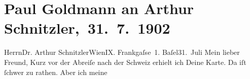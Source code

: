 

         
         \renewcommand{\erwaehntePersonen}{Personen: Maurice Maeterlinck}
         \renewcommand{\erwaehnteInstitutionen}{Institutionen: Deutsches Theater Berlin, Schiller-Theater}
         \renewcommand{\erwaehnteOrte}{Orte: Basel, Berlin, Frankgasse, Schweiz, Wien}
         \renewcommand{\erwaehnteWerke}{Werke: Der Schleier der Beatrice. Schauspiel in fünf Akten, Monna Vanna. Schauspiel in drei Akten}
               \section[ Paul Goldmann an Arthur Schnitzler, 31. 7. 1902]{ Paul Goldmann an Arthur Schnitzler, 31. 7. 1902}\nopagebreak{}\rehead{ }\begin{ledgroupsized}[t]{13cm}\normalsize\beginnumbering \toendnotes[C]{\smallbreak\pagebreak[2]} 
\toendnotes[C]{\smallbreak}\pstart{}{\pb}Herrn\pend{}\pstart{}Dr. Arthur Schnitzler\pend{}\pstart{}Wien\pend{}\pstart{}IX. Frankgaſse 1.\pend{}{\bigskip}\pstart
           \centering{}{\pb}Baſel31. Juli\pend
           \pstart
           Mein lieber Freund, Kurz vor der Abreiſe nach der Schweiz erhielt ich Deine \label{K_L03216-1v}\label{K_L03216-1h} Karte. Da iſt ſchwer zu rathen. Aber ich meine

\end{ledgroupsized}
